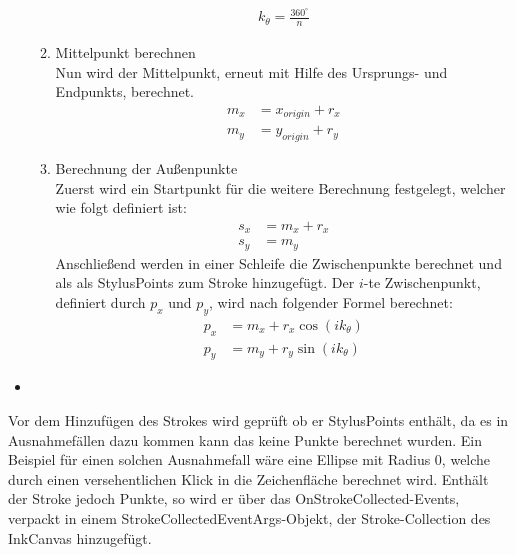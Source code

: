 \begin{itemize}
\begin{enumerate}
\begin{align}
k_{\theta} = \frac{360^\circ}{n}
\end{align}
\item Mittelpunkt berechnen\\
Nun wird der Mittelpunkt, erneut mit Hilfe des Ursprungs- und Endpunkts, berechnet.
\begin{align}
m_x &= x_{origin} + r_x\\
m_y &= y_{origin} + r_y
\end{align}
\item Berechnung der Außenpunkte\\
Zuerst wird ein Startpunkt für die weitere Berechnung festgelegt, welcher wie folgt definiert ist:
\begin{align}
s_x &= m_x + r_x\\
s_y &= m_y
\end{align}
Anschließend werden in einer Schleife die Zwischenpunkte berechnet und als als StylusPoints zum Stroke hinzugefügt. Der $i$-te Zwischenpunkt, definiert durch $p_x$ und $p_y$, wird nach folgender Formel berechnet:
\begin{align}
p_x &= m_x + r_x \cos(ik_\theta)\\
p_y &= m_y + r_y \sin(ik_\theta)
\end{align}
\end{enumerate}

\item
\end{itemize}
Vor dem Hinzufügen des Strokes wird geprüft ob er StylusPoints enthält, da es in Ausnahmefällen dazu kommen kann das keine Punkte berechnet wurden. Ein Beispiel für einen solchen Ausnahmefall wäre eine Ellipse mit Radius 0, welche durch einen versehentlichen Klick in die Zeichenfläche berechnet wird. Enthält der Stroke jedoch Punkte, so wird er über das OnStrokeCollected-Events, verpackt in einem StrokeCollectedEventArgs-Objekt, der Stroke-Collection des InkCanvas hinzugefügt. 

